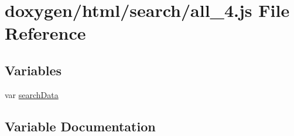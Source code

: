 \hypertarget{a00049}{}\section{doxygen/html/search/all\+\_\+4.js File Reference}
\label{a00049}
\subsection*{Variables}
\begin{DoxyCompactItemize}
\item 
var \hyperlink{a00049_ad01a7523f103d6242ef9b0451861231e}{search\+Data}
\end{DoxyCompactItemize}


\subsection{Variable Documentation}
\hypertarget{a00049_ad01a7523f103d6242ef9b0451861231e}{}
